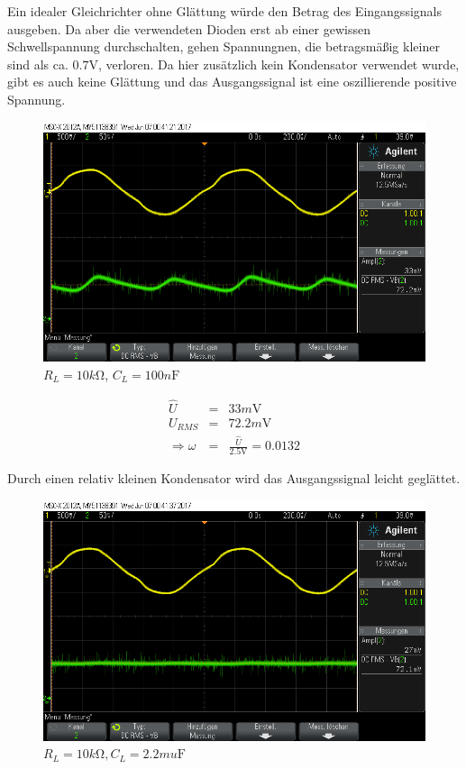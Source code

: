 \documentclass[10pt]{scrreprt}
\begin{document}
    Ein idealer Gleichrichter ohne Glättung würde den Betrag des Eingangssignals
    ausgeben. Da aber die verwendeten Dioden erst ab einer gewissen Schwellspannung
    durchschalten, gehen Spannungnen, die betragsmäßig kleiner sind als ca.
    $0.7\si{\volt}$, verloren. Da hier zusätzlich kein Kondensator verwendet wurde,
    gibt es auch keine Glättung und das Ausgangssignal ist eine oszillierende
    positive Spannung.

    \begin{figure}[H]
        \includegraphics[width=\textwidth]{scope_5.png}
        \caption{$R_L  = 10\si{k \ohm}$, $C_L = 100\si{n\farad}$}
    \end{figure}

    \begin{eqnarray*}
        \hat{U} &=& 33\si{m\volt}\\
        U_{RMS} &=& 72.2\si{m\volt}\\
        \Rightarrow \omega &=& \frac{\hat{U}}{2.5\si{\volt}} = 0.0132
    \end{eqnarray*}

    Durch einen relativ kleinen Kondensator wird das Ausgangssignal leicht geglättet.

    \begin{figure}[H]
        \includegraphics[width=\textwidth]{scope_6.png}
        \caption{$R_L  = 10\si{k \ohm}, C_L = 2.2\si{mu\farad}$}
        \label{fig:FuckAll}
    \end{figure}
\end{document}
